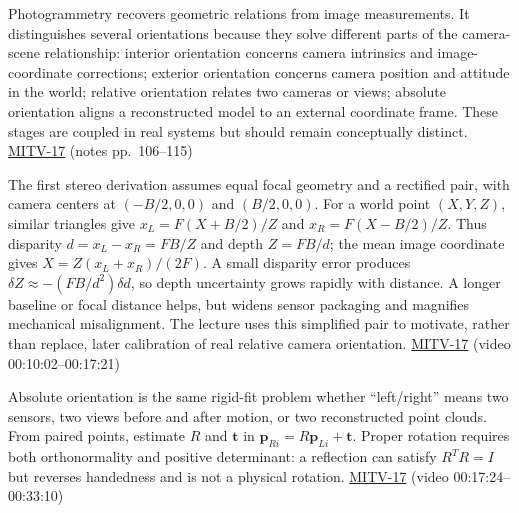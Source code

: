 \hypertarget{04-visual-computing-ii-ch032-photogrammetry-orientation-is-a-family-of-related-unknowns}{}

Photogrammetry recovers geometric relations from image measurements. It distinguishes several orientations because they solve different parts of the camera-scene relationship: interior orientation concerns camera intrinsics and image-coordinate corrections; exterior orientation concerns camera position and attitude in the world; relative orientation relates two cameras or views; absolute orientation aligns a reconstructed model to an external coordinate frame. These stages are coupled in real systems but should remain conceptually distinct. \hyperref[04-visual-computing-ii-ch036-mitv-17---photogrammetry-orientation-axes-of-inertia-symmetry-orientation]{MITV-17} (notes pp.~106--115)

The first stereo derivation assumes equal focal geometry and a rectified pair, with camera centers at \((-B/2,0,0)\) and \((B/2,0,0)\). For a world point \((X,Y,Z)\), similar triangles give \(x_L=F(X+B/2)/Z\) and \(x_R=F(X-B/2)/Z\). Thus disparity \(d=x_L-x_R=FB/Z\) and depth \(Z=FB/d\); the mean image coordinate gives \(X=Z(x_L+x_R)/(2F)\). A small disparity error produces \(\delta Z\approx-(FB/d^2)\delta d\), so depth uncertainty grows rapidly with distance. A longer baseline or focal distance helps, but widens sensor packaging and magnifies mechanical misalignment. The lecture uses this simplified pair to motivate, rather than replace, later calibration of real relative camera orientation. \hyperref[04-visual-computing-ii-ch036-mitv-17---photogrammetry-orientation-axes-of-inertia-symmetry-orientation]{MITV-17} (video 00:10:02--00:17:21)

Absolute orientation is the same rigid-fit problem whether ``left/right'' means two sensors, two views before and after motion, or two reconstructed point clouds. From paired points, estimate \(R\) and \(\mathbf{t}\) in \(\mathbf{p}_{Ri}=R\mathbf{p}_{Li}+\mathbf{t}\). Proper rotation requires both orthonormality and positive determinant: a reflection can satisfy \(R^TR=I\) but reverses handedness and is not a physical rotation. \hyperref[04-visual-computing-ii-ch036-mitv-17---photogrammetry-orientation-axes-of-inertia-symmetry-orientation]{MITV-17} (video 00:17:24--00:33:10)

